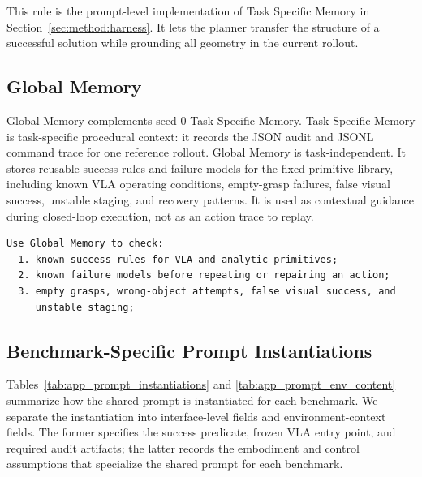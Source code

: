 \documentclass[11pt]{article}
\begin{document}
This rule is the prompt-level implementation of Task Specific Memory in
Section~\ref{sec:method:harness}. It lets the planner transfer the structure of a
successful solution while grounding all geometry in the current rollout.

\subsection{Global Memory}
  \label{app:agent_prompt:global_memory}

  Global Memory complements seed 0 Task Specific Memory. Task Specific Memory is task-specific
  procedural context: it records the JSON audit and JSONL command trace for one
  reference rollout. Global Memory is task-independent. It stores reusable success rules
  and failure models for the fixed primitive library, including known VLA operating
  conditions, empty-grasp failures, false visual success, unstable staging, and recovery
  patterns. It is used as contextual guidance during closed-loop execution, not as an
  action trace to replay.

  \begin{samepage}
  \begin{lstlisting}[frame=single,framerule=0.5pt]
  Use Global Memory to check:
  1. known success rules for VLA and analytic primitives;
  2. known failure models before repeating or repairing an action;
  3. empty grasps, wrong-object attempts, false visual success, and
     unstable staging;
  \end{lstlisting}
  \end{samepage}

\subsection{Benchmark-Specific Prompt Instantiations}
\label{app:agent_prompt:instantiations}

Tables~\ref{tab:app_prompt_instantiations} and
\ref{tab:app_prompt_env_content} summarize how the shared prompt is instantiated for
each benchmark. We separate the instantiation into interface-level fields and
environment-context fields. The former specifies the success predicate, frozen VLA
entry point, and required audit artifacts; the latter records the embodiment and
control assumptions that specialize the shared prompt for each benchmark.
\end{document}
